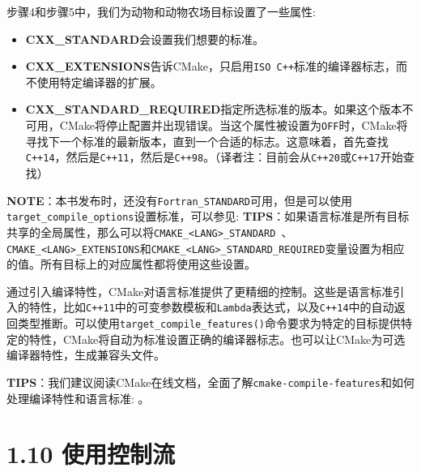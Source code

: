 
步骤4和步骤5中，我们为动物和动物农场目标设置了一些属性:

\begin{itemize}
\item \textbf{CXX\_STANDARD}会设置我们想要的标准。

\item \textbf{CXX\_EXTENSIONS}告诉CMake，只启用\texttt{ISO C++}标准的编译器标志，而不使用特定编译器的扩展。

\item \textbf{CXX\_STANDARD\_REQUIRED}指定所选标准的版本。如果这个版本不可用，CMake将停止配置并出现错误。当这个属性被设置为\texttt{OFF}时，CMake将寻找下一个标准的最新版本，直到一个合适的标志。这意味着，首先查找\texttt{C++14}，然后是\texttt{C++11}，然后是\texttt{C++98}。（译者注：目前会从\texttt{C++20}或\texttt{C++17}开始查找）

\end{itemize}

\begin{myInfoBox}
\textbf{NOTE}：本书发布时，还没有\texttt{Fortran\_STANDARD}可用，但是可以使用\texttt{target\_compile\_options}设置标准，可以参见:  \textbf{TIPS}：如果语言标准是所有目标共享的全局属性，那么可以将\texttt{CMAKE\_<LANG>\_STANDARD }、\texttt{CMAKE\_<LANG>\_EXTENSIONS}和\texttt{CMAKE\_<LANG>\_STANDARD\_REQUIRED}变量设置为相应的值。所有目标上的对应属性都将使用这些设置。
\end{myInfoBox}


通过引入编译特性，CMake对语言标准提供了更精细的控制。这些是语言标准引入的特性，比如\texttt{C++11}中的可变参数模板和\texttt{Lambda}表达式，以及\texttt{C++14}中的自动返回类型推断。可以使用\texttt{target\_compile\_features()}命令要求为特定的目标提供特定的特性，CMake将自动为标准设置正确的编译器标志。也可以让CMake为可选编译器特性，生成兼容头文件。

\begin{myInfoBox}
\textbf{TIPS}：我们建议阅读CMake在线文档，全面了解\texttt{cmake-compile-features}和如何处理编译特性和语言标准:  。
\end{myInfoBox}


\section{1.10 使用控制流}


